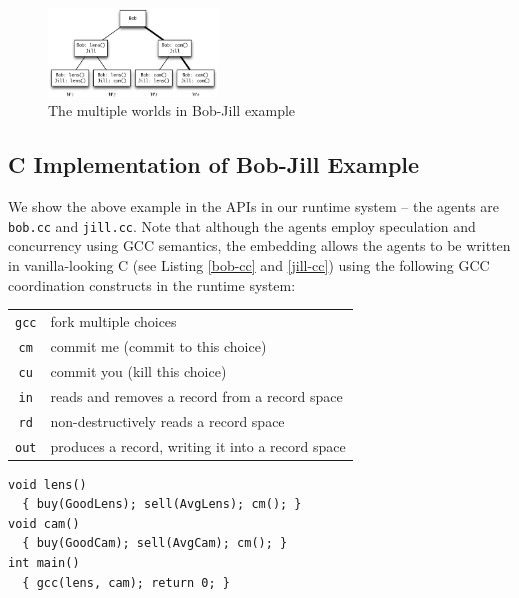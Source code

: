 \documentclass[preprint,10pt]{sigplanconf}
\newcommand{\monospace}[1]{\texttt{\small #1}}
\begin{document}
\begin{figure}
\begin{center}
    \includegraphics[width=0.4\textwidth]{eps/multi-worlds}
    \vspace{-3mm}
    \caption{The multiple worlds in Bob-Jill example}
    \label{fig:multi-worlds}
\end{center}
\end{figure}

\subsection{C Implementation of Bob-Jill Example}

We show the above example in the APIs in our runtime system --
the agents are \monospace{bob.cc} and \monospace{jill.cc}. 
Note that although the agents employ speculation and concurrency
  using GCC semantics, the embedding allows the agents to be written in
  vanilla-looking C (see Listing \ref{bob-cc} and \ref{jill-cc}) using
the following GCC coordination constructs in the runtime system:
\begin{center}
\begin{tabular}{c|l}
  \hline
  \monospace{gcc} & fork multiple choices \\
  \monospace{cm}  & commit me (commit to this choice) \\
  \monospace{cu}  & commit you (kill this choice) \\
  \hline
  \monospace{in}  & reads and removes a record from a record space \\
  \monospace{rd}  & non-destructively reads a record space \\
  \monospace{out} & produces a record, writing it into a record space \\
  \hline
\end{tabular}
\end{center}


\begin{lstlisting}[label=bob-cc,caption=\monospace{bob.cc}]
void lens()
  { buy(GoodLens); sell(AvgLens); cm(); }
void cam()
  { buy(GoodCam); sell(AvgCam); cm(); }
int main()
  { gcc(lens, cam); return 0; }
\end{lstlisting}
\end{document}
